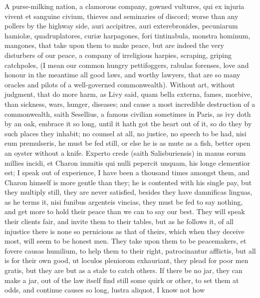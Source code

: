 {A purse-milking nation, a clamorous company, gowned vultures, qui
ex injuria vivent et sanguine civium, thieves and seminaries of
discord; worse than any pollers by the highway side, auri accipitres,
auri exterebronides, pecuniarum hamiol\ae{}, quadruplatores, curi\ae{}
harpagones, fori tintinabula, monstra hominum, mangones, \etc{} that take
upon them to make peace, but are indeed the very disturbers of our
peace, a company of irreligious harpies, scraping, griping catchpoles,
(I mean our common hungry pettifoggers, rabulas forenses, love and
honour in the meantime all good laws, and worthy lawyers, that are so
many oracles and pilots of a well-governed commonwealth). Without
art, without judgment, that do more harm, as Livy said, quam bella
externa, fames, morbive, than sickness, wars, hunger, diseases; and
cause a most incredible destruction of a commonwealth, saith
Sesellius, a famous civilian sometimes in Paris, as ivy doth by an
oak, embrace it so long, until it hath got the heart out of it, so do
they by such places they inhabit; no counsel at all, no justice, no
speech to be had, nisi eum premulseris, he must be fed still, or else
he is as mute as a fish, better open an oyster without a knife. Experto
crede (saith  Salisburiensis) in manus eorum millies incidi, et
Charon immitis qui nulli pepercit unquam, his longe clementior est; I
speak out of experience, I have been a thousand times amongst them, and
Charon himself is more gentle than they; he is contented with his
single pay, but they multiply still, they are never satisfied, besides
they have damnificas linguas, as he terms it, nisi funibus argenteis
vincias, they must be fed to say nothing, and get more to hold
their peace than we can to say our best. They will speak their clients
fair, and invite them to their tables, but as he follows it, of
all injustice there is none so pernicious as that of theirs, which when
they deceive most, will seem to be honest men. They take upon them to
be peacemakers, et fovere causas humilium, to help them to their right,
patrocinantur afflictis, but all is for their own good, ut loculos
pleniorom exhauriant, they plead for poor men gratis, but they are but
as a stale to catch others. If there be no jar, they can make a
jar, out of the law itself find still some quirk or other, to set them
at odds, and continue causes so long, lustra aliquot, I know not how
}
